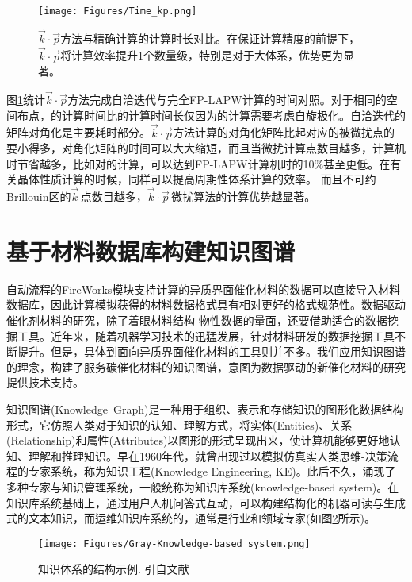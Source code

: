 \begin{figure}[h!]
\centering
\texttt{[image: Figures/Time\_kp.png]}
\caption{{$\vec k\cdot\vec p$方法与精确计算的计算时长对比。在保证计算精度的前提下，$\vec k\cdot\vec p$将计算效率提升1个数量级，特别是对于大体系，优势更为显著。}}%
\label{Time_kp}
\end{figure}
图\ref{Time_kp}统计$\vec k\cdot\vec p$方法完成自洽迭代与完全FP-LAPW计算的时间对照。对于相同的空间布点，的计算时间比的计算时间长仅因为的计算需要考虑自旋极化。自洽迭代的矩阵对角化是主要耗时部分。$\vec k\cdot\vec p$方法计算的对角化矩阵比起对应的被微扰点的要小得多，对角化矩阵的时间可以大大缩短，而且当微扰计算点数目越多，计算机时节省越多，比如对的计算，可以达到\textrm{FP-LAPW}计算机时的10\%甚至更低。在有关晶体性质计算的时候，同样可以提高周期性体系计算的效率。
而且不可约\textrm{Brillouin}区的$\vec k$\,点数目越多，$\vec k\cdot\vec p$\,微扰算法的计算优势越显著。

\section{基于材料数据库构建知识图谱}
自动流程的\textrm{FireWorks}模块支持计算的异质界面催化材料的数据可以直接导入材料数据库，因此计算模拟获得的材料数据格式具有相对更好的格式规范性。数据驱动催化剂材料的研究，除了着眼材料结构-物性数据的量面，还要借助适合的数据挖掘工具。近年来，随着机器学习技术的迅猛发展，针对材料研发的数据挖掘工具不断提升。但是，具体到面向异质界面催化材料的工具则并不多。我们应用知识图谱的理念，构建了服务碳催化材料的知识图谱，意图为数据驱动的新催化材料的研究提供技术支持。

知识图谱\textrm{(Knowledge~Graph)}是一种用于组织、表示和存储知识的图形化数据结构形式，它仿照人类对于知识的认知、理解方式，将实体\textrm{(Entities)}、关系\textrm{(Relationship)}和属性\textrm{(Attributes)}以图形的形式呈现出来，使计算机能够更好地认知、理解和推理知识。早在1960年代，就曾出现过以模拟仿真实人类思维-决策流程的专家系统，称为知识工程\textrm{(Knowledge Engineering, KE)}。此后不久，涌现了多种专家与知识管理系统，一般统称为知识库系统\textrm{(knowledge-based system)}。在知识库系统基础上，通过用户人机问答式互动，可以构建结构化的机器可读与生成式的文本知识，而运维知识库系统的，通常是行业和领域专家(如图\ref{Fig:Knowledge-based_system}所示)。
\begin{figure}[h!]
\centering
\texttt{[image: Figures/Gray-Knowledge-based\_system.png]}
\caption{\small\textrm{知识体系的结构示例. 引自文献~\cite{ACR56-128_2023}}}%
\label{Fig:Knowledge-based_system}
\end{figure}

